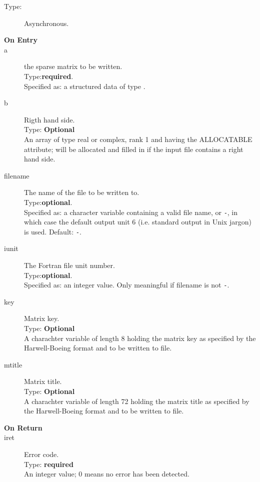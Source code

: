 


\begin{description}
\item[Type:] Asynchronous.
\item[\bf  On Entry ]
\item[a] the sparse matrix to be written.\\
Type:{\bf required}.\\
Specified as: a structured data of type \spdata.
\item[b] Rigth hand side.\\
Type: {\bf Optional} \\
An  array of type real or complex, rank 1 and having the ALLOCATABLE
attribute; will be allocated and filled in if the input file contains
a right hand side. 
\item[filename] The name of the file to be written to.\\
Type:{\bf optional}.\\
Specified as: a character variable containing a valid file name, or
\verb|-|, in which case the default output unit  6 (i.e. standard output
in Unix jargon) is used. Default: \verb|-|. 
\item[iunit] The Fortran file unit number.\\
Type:{\bf optional}.\\
Specified as: an integer value. Only meaningful if filename is not \verb|-|.
\item[key] Matrix key.\\
Type: {\bf Optional} \\
A charachter variable of length 8 holding the
matrix key as specified by the Harwell-Boeing format and to be
written to file.
\item[mtitle] Matrix title.\\
Type: {\bf Optional} \\
A charachter variable of length 72 holding the
matrix title as specified by the Harwell-Boeing format and to be
written to file.
\end{description}

\begin{description}
\item[\bf On Return]
\item[iret] Error code.\\
Type: {\bf required} \\
An integer value; 0 means no error has been detected. 
\end{description}




